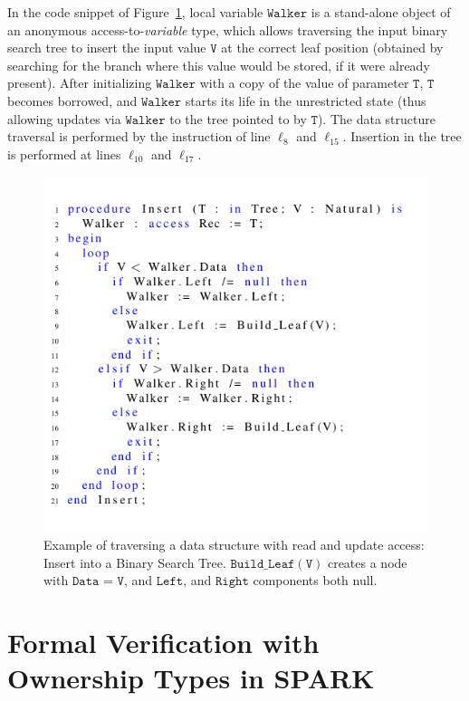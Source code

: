 \documentclass{llncs}
\newcommand\var[1]{\ensuremath{\mathtt{#1}}}
\begin{document}
In the code snippet of Figure~\ref{fig:treeInsert}, local variable \var{Walker} is a stand-alone object of an anonymous access-to-\textit{variable} type, which allows traversing the input binary
search tree to insert the input value \var{V} at the correct leaf position (obtained by searching for the branch where this value would be stored, if it were already present).
After initializing \var{Walker} with a copy of the value of parameter \var{T}, \var{T} becomes borrowed, and \var{Walker} starts its life in the unrestricted state (thus allowing updates via \var{Walker} to the tree pointed to by \var{T}).
The data structure traversal is performed by the instruction of line $\ell_8$ and $\ell_{15}$. Insertion in the tree is performed at lines
$\ell_{10}$ and $\ell_{17}$.


\begin{figure}[htb!]
\centering
  \captionsetup{justification=centering,margin=0.6cm}
   \includegraphics[]{treeInsert}
   \caption{Example of traversing a data structure with read and  update access: Insert into a Binary Search Tree. \var{Build\_Leaf(V)} creates a node with \var{Data} = \var{V}, and \var{Left}, and \var{Right} components both null.}
   \label{fig:treeInsert}  
\end{figure}


\section{Formal Verification with Ownership Types in SPARK}
\end{document}
